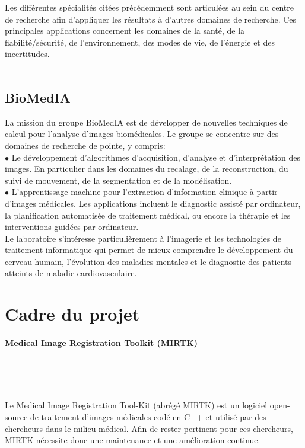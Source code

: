 \documentclass[10pt]{report}
\begin{document}
	Les différentes spécialités citées précédemment sont articulées au sein du centre de recherche afin d'appliquer les résultats à d'autres domaines de recherche. Ces principales applications concernent les domaines de la santé, de la fiabilité/sécurité, de l'environnement, des modes de vie, de l'énergie et des incertitudes.
	\\
	\\
	\subsection{BioMedIA}
	
	La mission du groupe BioMedIA est de développer de nouvelles techniques de
	calcul pour l'analyse d'images biomédicales. Le groupe se concentre sur des
	domaines de recherche de pointe, y compris:\\

	{$\bullet$} Le développement d'algorithmes d'acquisition, d'analyse et d'interprétation des images. En particulier dans les domaines du recalage, de la reconstruction,
	du suivi de mouvement, de la segmentation et de la modélisation. \\

	{$\bullet$} L'apprentissage machine pour l'extraction d'information clinique à partir
	d'images médicales. Les applications incluent le diagnostic assisté par
	ordinateur, la planification automatisée de traitement médical, ou encore la thérapie et les interventions guidées par ordinateur. \\

	Le laboratoire s'intéresse particulièrement à l'imagerie et les technologies de
	traitement informatique qui permet de mieux comprendre le
	développement du cerveau humain, l’évolution des maladies mentales et le
	diagnostic des patients atteints de maladie cardiovasculaire.
	
	
	\section{Cadre du projet} %
	\paragraph{Medical Image Registration Toolkit (MIRTK)}~\par~\par
	Le Medical Image Registration Tool-Kit (abrégé MIRTK) est un logiciel open-source de traitement d'images médicales codé en C++ et utilisé par des chercheurs dans le milieu médical.  %
	Afin de rester pertinent pour ces chercheurs, MIRTK nécessite donc une maintenance et une amélioration continue.\\
	
\end{document}
